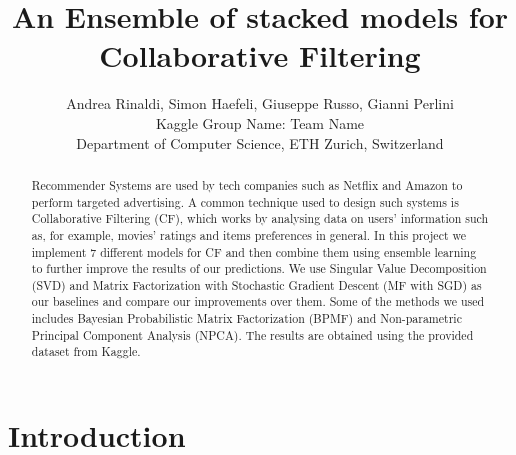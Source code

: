 \documentclass[10pt,conference,compsocconf]{IEEEtran}
\begin{document}
\title{An Ensemble of stacked models for Collaborative Filtering}

\author{
  Andrea Rinaldi, Simon Haefeli, Giuseppe Russo, Gianni Perlini\\
  Kaggle Group Name: Team Name \\
  Department of Computer Science, ETH Zurich, Switzerland
}

\maketitle

\begin{abstract}

Recommender Systems are used by tech companies such as Netflix and Amazon to perform targeted advertising. A common technique used to design such systems is Collaborative Filtering (CF), which works by analysing data on users' information such as, for example, movies' ratings and items preferences in general. In this project we implement 7 different models for CF and then combine them using ensemble learning to further improve the results of our predictions. We use Singular Value Decomposition (SVD) and Matrix Factorization with Stochastic Gradient Descent (MF with SGD) as our baselines and compare our improvements over them. Some of the methods we used includes Bayesian Probabilistic Matrix Factorization (BPMF) and Non-parametric Principal Component Analysis (NPCA). The results are obtained using the provided dataset from Kaggle.

\end{abstract}

\section{Introduction}
\label{int}
\end{document}
